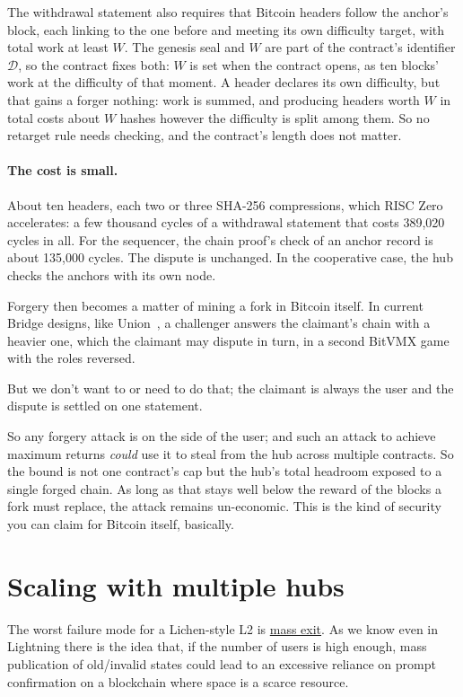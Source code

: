 \documentclass[11pt]{article}
\begin{document}
The withdrawal
statement also requires that Bitcoin headers follow the anchor's block, each
linking to the one before and meeting its own difficulty target, with
total work at least $W$. The genesis seal and $W$ are part of the
contract's identifier $\mathcal{D}$, so the contract fixes both: $W$
is set when the contract opens, as ten blocks' work at the difficulty of
that moment. A header declares its own difficulty, but that gains a
forger nothing: work is summed, and producing headers worth $W$ in total
costs about $W$ hashes however the difficulty is split among them. So
no retarget rule needs checking, and the contract's length does not
matter.

\paragraph{The cost is small.} About ten headers, each two or three
SHA-256 compressions, which RISC Zero accelerates: a few thousand cycles
of a withdrawal statement that costs 389,020 cycles in all. For the
sequencer, the chain proof's check of an anchor record is about 135,000
cycles. The dispute is unchanged. In the cooperative case, the hub
checks the anchors with its own node.

Forgery then becomes a matter of mining a fork in Bitcoin itself. In current Bridge designs, like Union~\cite{union}, a challenger answers the claimant's chain with a
heavier one, which the claimant may dispute in turn, in a second BitVMX
game with the roles reversed.

But we don't want to or need to do that; the claimant is always the user and the dispute is settled on one statement.

So any forgery attack is on the side of the user; and such an attack to achieve maximum returns \emph{could} use it to steal from the hub across multiple contracts.
So the bound is not one contract's cap but
the hub's total headroom exposed to a single forged chain. As long as
that stays well below the reward of the blocks a fork must replace, the attack remains un-economic. This is the kind of security you can claim for Bitcoin itself, basically.

\section{Scaling with multiple hubs}
\label{sec:multihub}

The worst failure mode for a Lichen-style L2 is \underline{mass exit}. As we know even in Lightning there is the idea that, if the number of users is high enough, mass publication of old/invalid states could lead to an excessive reliance on prompt confirmation on a blockchain where space is a scarce resource.
\end{document}
